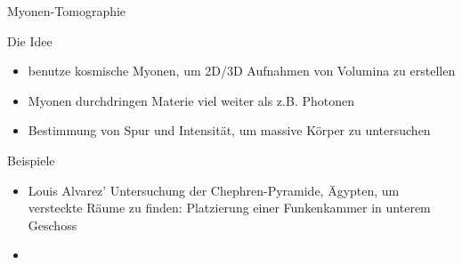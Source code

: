 

\begin{frame}{Myonen-Tomographie}

		\begin{block}{Die Idee}
			\begin{itemize}
			 	\item benutze kosmische Myonen, um 2D/3D Aufnahmen von Volumina zu erstellen
		  		\item Myonen durchdringen Materie viel weiter als z.B. Photonen
		  		\item Bestimmung von Spur und Intensität, um massive Körper zu untersuchen
			\end{itemize}
		\end{block}
		
		\begin{block}{Beispiele}
			\begin{itemize}
			 	\item Louis Alvarez' Untersuchung der Chephren-Pyramide, Ägypten, um versteckte Räume zu
			 	finden: Platzierung einer Funkenkammer in unterem Geschoss
			 	\item 
			\end{itemize}
		\end{block}
\end{frame}